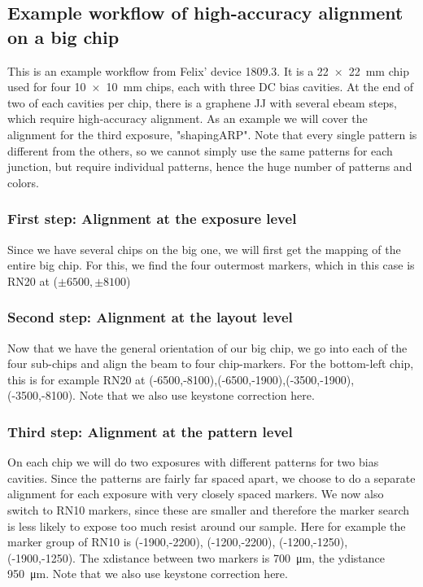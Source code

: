 \subsection{Example workflow of high-accuracy alignment on a big chip}
This is an example workflow from Felix' device 1809.3. It is a \SI{22x22}{\milli\meter} chip used for four \SI{10x10}{\milli\meter} chips, each with three DC bias cavities. At the end of two of each cavities per chip, there is a graphene JJ with several ebeam steps, which require high-accuracy alignment. As an example we will cover the alignment for the third exposure, "shapingARP". Note that every single pattern is different from the others, so we cannot simply use the same patterns for each junction, but require individual patterns, hence the huge number of patterns and colors.

\subsubsection{First step: Alignment at the exposure level}
Since we have several chips on the big one, we will first get the mapping of the entire big chip. For this, we find the four outermost markers, which in this case is RN20 at ($\pm6500,\pm8100$)

\subsubsection{Second step: Alignment at the layout level}
Now that we have the general orientation of our big chip, we go into each of the four sub-chips and align the beam to four chip-markers. For the bottom-left chip, this is for example RN20 at (-6500,-8100),(-6500,-1900),(-3500,-1900),(-3500,-8100). Note that we also use keystone correction here.

\subsubsection{Third step: Alignment at the pattern level}
On each chip we will do two exposures with different patterns for two bias cavities. Since the patterns are fairly far spaced apart, we choose to do a separate alignment for each exposure with very closely spaced markers. We now also switch to RN10 markers, since these are smaller and therefore the marker search is less likely to expose too much resist around our sample. Here for example the marker group of RN10 is (-1900,-2200), (-1200,-2200), (-1200,-1250), (-1900,-1250). The xdistance between two markers is \SI{700}{\micro\meter}, the ydistance \SI{950}{\micro\meter}. Note that we also use keystone correction here.

